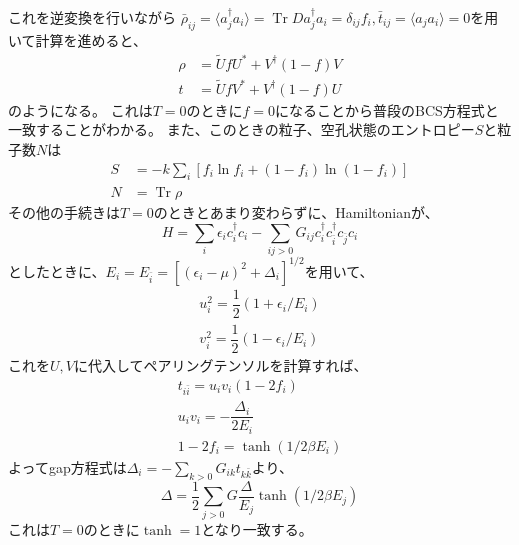 \documentclass[a4paper,11pt]{jsarticle}
\begin{document}
  これを逆変換を行いながら
  $\bar{\rho}_{ij}=\langle a_j^\dagger a_i\rangle=\operatorname{Tr}D a_j^\dagger a_i=\delta_{ij}f_i,
  \bar{t}_{ij}=\langle a_j a_i\rangle=0$を用いて計算を進めると、
  \begin{align}
    \rho &= \tilde{U}fU^{*} + V^{\dagger}(1-f)V \\
    t    &= \tilde{U}fV^{*} + V^{\dagger}(1-f)U
  \end{align}
  のようになる。
  これは$T=0$のときに$f=0$になることから普段のBCS方程式と一致することがわかる。
  また、このときの粒子、空孔状態のエントロピー$S$と粒子数$N$は
  \begin{align}
    S &= -k\sum_{i}\left[f_i\ln f_i + (1-f_i)\ln (1 - f_i)\right]\\
    N &= \operatorname{Tr}\rho
  \end{align}
  その他の手続きは$T=0$のときとあまり変わらずに、Hamiltonianが、
  \begin{equation}
    H=\sum_{i}\epsilon_ic_i^{\dagger}c_i-\sum_{ij>0}G_{ij}c_i^{\dagger}c_{\bar{i}}^{\dagger}c_{\bar{j}}c_i
  \end{equation}
  としたときに、$E_i=E_{\bar{i}}=[(\epsilon_i -\mu)^2 +\Delta_i]^{1/2}$を用いて、
  \begin{align}
    u_i^2 = \dfrac{1}{2}(1+\epsilon_i/E_i)\\
    v_i^2 = \dfrac{1}{2}(1-\epsilon_i/E_i)
  \end{align}
  これを$U,V$に代入してペアリングテンソルを計算すれば、
  \begin{align}
    t_{i\bar{i}}=u_iv_i(1-2f_i)\\
    u_iv_i=-\dfrac{\Delta_i}{2E_i}\\
    1-2f_i=\tanh(1/2\beta E_i)
  \end{align}
  よってgap方程式は$\Delta_i=-\sum_{k>0}G_{ik}t_{k\bar{k}}$より、
  \begin{equation}
    \Delta = \dfrac{1}{2}\sum_{j>0}G\dfrac{\Delta}{E_j} \tanh{(1/2\beta E_j)}
  \end{equation}
  これは$T=0$のときに$\tanh = 1$となり一致する。
\end{document}
